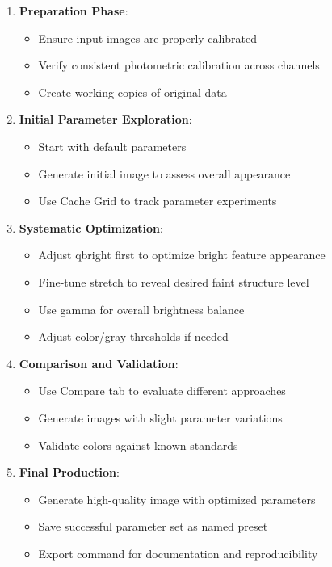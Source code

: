 \documentclass[11pt,a4paper]{article}
\begin{document}
\begin{enumerate}
\item \textbf{Preparation Phase}:
   \begin{itemize}
   \item Ensure input images are properly calibrated
   \item Verify consistent photometric calibration across channels
   \item Create working copies of original data
   \end{itemize}

\item \textbf{Initial Parameter Exploration}:
   \begin{itemize}
   \item Start with default parameters
   \item Generate initial image to assess overall appearance
   \item Use Cache Grid to track parameter experiments
   \end{itemize}

\item \textbf{Systematic Optimization}:
   \begin{itemize}
   \item Adjust qbright first to optimize bright feature appearance
   \item Fine-tune stretch to reveal desired faint structure level
   \item Use gamma for overall brightness balance
   \item Adjust color/gray thresholds if needed
   \end{itemize}

\item \textbf{Comparison and Validation}:
   \begin{itemize}
   \item Use Compare tab to evaluate different approaches
   \item Generate images with slight parameter variations
   \item Validate colors against known standards
   \end{itemize}

\item \textbf{Final Production}:
   \begin{itemize}
   \item Generate high-quality image with optimized parameters
   \item Save successful parameter set as named preset
   \item Export command for documentation and reproducibility
   \end{itemize}
\end{enumerate}
\end{document}
